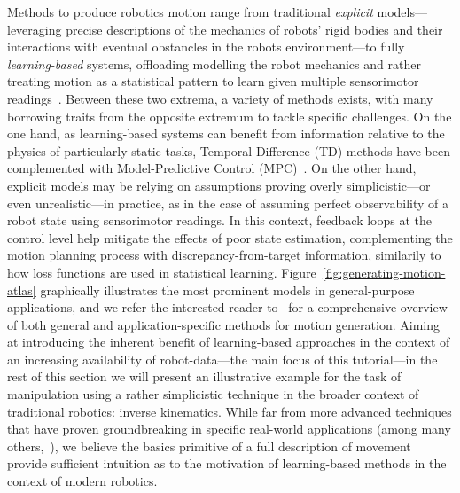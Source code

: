 Methods to produce robotics motion range from traditional \emph{explicit} models---leveraging precise descriptions of the mechanics of robots' rigid bodies and their interactions with eventual obstancles in the robots environment---to fully \emph{learning-based} systems, offloading modelling the robot mechanics and rather treating motion as a statistical pattern to learn given multiple sensorimotor readings~\citep{bekrisStateRobotMotion2024}.
Between these two extrema, a variety of methods exists, with many borrowing traits from the opposite extremum to tackle specific challenges.
On the one hand, as learning-based systems can benefit from information relative to the physics of particularly static tasks, Temporal Difference (TD) methods have been complemented with Model-Predictive Control (MPC)~\citep{hansenTemporalDifferenceLearning2022}.
On the other hand, explicit models may be relying on assumptions proving overly simplicistic---or even unrealistic---in practice, as in the case of assuming perfect observability of a robot state using sensorimotor readings. In this context, feedback loops at the control level help mitigate the effects of poor state estimation, complementing the motion planning process with discrepancy-from-target information, similarily to how loss functions are used in statistical learning.
Figure~\ref{fig:generating-motion-atlas} graphically illustrates the most prominent models in general-purpose applications, and we refer the interested reader to~\citet{bekrisStateRobotMotion2024} for a comprehensive overview of both general and application-specific methods for motion generation.
Aiming at introducing the inherent benefit of learning-based approaches in the context of an increasing availability of robot-data---the main focus of this tutorial---in the rest of this section we will present an illustrative example for the task of manipulation using a rather simplicistic technique in the broader context of traditional robotics: inverse kinematics.
While far from more advanced techniques that have proven groundbreaking in specific real-world applications (among many others,~\citep{hansenTemporalDifferenceLearning2022,burridgeSequentialCompositionDynamically1999b}), we believe the basics primitive of a full description of movement provide sufficient intuition as to the motivation of learning-based methods in the context of modern robotics.

